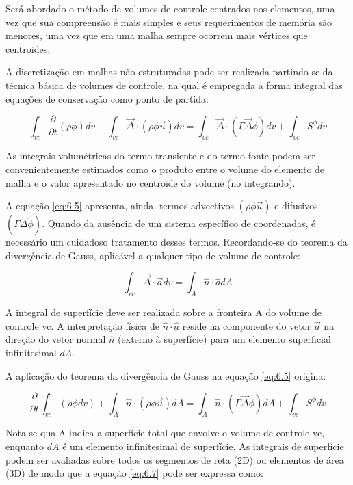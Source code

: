 Será abordado o método de volumes de controle centrados nos elementos, uma vez que sua compreensão é mais simples e seus requerimentos de memória são menores, uma vez que em uma malha sempre ocorrem mais vértices que centroides.

A discretização em malhas não-estruturadas pode ser realizada partindo-se da técnica básica de volumes de controle, na qual é empregada a forma integral das equações de conservação como ponto de partida:

\begin{equation}
    \label{eq:6.5}
    \int_{vc} \frac{\partial}{\partial t} (\rho \phi) dv + \int_{vc} \vec{\Delta} \cdot (\rho \phi \vec{u}) dv = \int_{vc} \vec{\Delta} \cdot (\Gamma \vec{\Delta} \phi) dv + \int_{vc} S^\phi dv
\end{equation}

As integrais volumétricas do termo transiente e do termo fonte podem ser convenientemente estimados como o produto entre o volume do elemento de malha e o valor apresentado no centroide do volume (no integrando).

A equação \ref{eq:6.5} apresenta, ainda, termos advectivos $(\rho \phi \vec{u})$ e difusivos $(\Gamma \vec{\Delta} \phi)$. Quando da ausência de um sistema específico de coordenadas, é necessário um cuidadoso tratamento desses termos. Recordando-se do teorema da divergência de Gauss, aplicável a qualquer tipo de volume de controle:

\begin{equation}
    \label{eq:6.6}
    \int_{vc}\vec{\Delta} \cdot \vec{a} dv = \int_A \hat{n} \cdot \hat{a} dA
\end{equation}

A integral de superfície deve ser realizada sobre a fronteira A do volume de controle vc. A interpretação física de $\hat{n} \cdot \hat{a}$ reside na componente do vetor $\vec{a}$ na direção do vetor normal $\hat{n}$ (externo à superfície) para um elemento superficial infinitesimal $dA$.

A aplicação do teorema da divergência de Gauss na equação \ref{eq:6.5} origina:

\begin{equation}
    \label{eq:6.7}
    \frac{\partial}{\partial t}\int_{vc} (\rho \phi dv) + \int_A \hat{n} \cdot (\rho \phi \vec{u}) dA = \int_A \hat{n} \cdot (\Gamma \vec{\Delta} \phi)dA + \int_{vc}S^\phi dv
\end{equation}

Nota-se qua A indica a superfície total que envolve o volume de controle vc, enquanto $dA$ é um elemento infinitesimal de superfície. As integrais de superfície podem ser avaliadas sobre todos os segmentos de reta (2D) ou elementos de área (3D) de modo que a equação \ref{eq:6.7} pode ser expressa como:

